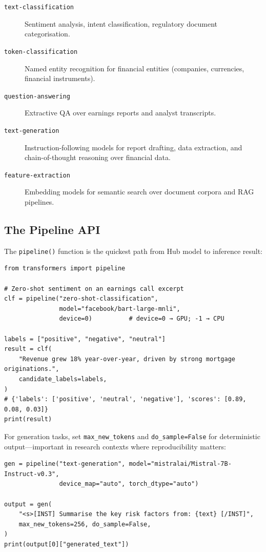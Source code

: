 \begin{description}
  \item[\texttt{text-classification}] Sentiment analysis, intent classification,
        regulatory document categorisation.
  \item[\texttt{token-classification}] Named entity recognition for financial
        entities (companies, currencies, financial instruments).
  \item[\texttt{question-answering}] Extractive QA over earnings reports and
        analyst transcripts.
  \item[\texttt{text-generation}] Instruction-following models for report
        drafting, data extraction, and chain-of-thought reasoning over
        financial data.
  \item[\texttt{feature-extraction}] Embedding models for semantic search over
        document corpora and RAG pipelines.
\end{description}

\subsection{The Pipeline API}
\label{app:hf:pipeline}

The \texttt{pipeline()} function is the quickest path from Hub model to
inference result:

\begin{verbatim}
from transformers import pipeline

# Zero-shot sentiment on an earnings call excerpt
clf = pipeline("zero-shot-classification",
               model="facebook/bart-large-mnli",
               device=0)          # device=0 → GPU; -1 → CPU

labels = ["positive", "negative", "neutral"]
result = clf(
    "Revenue grew 18% year-over-year, driven by strong mortgage originations.",
    candidate_labels=labels,
)
# {'labels': ['positive', 'neutral', 'negative'], 'scores': [0.89, 0.08, 0.03]}
print(result)
\end{verbatim}

For generation tasks, set \texttt{max\_new\_tokens} and
\texttt{do\_sample=False} for deterministic output---important in research
contexts where reproducibility matters:

\begin{verbatim}
gen = pipeline("text-generation", model="mistralai/Mistral-7B-Instruct-v0.3",
               device_map="auto", torch_dtype="auto")

output = gen(
    "<s>[INST] Summarise the key risk factors from: {text} [/INST]",
    max_new_tokens=256, do_sample=False,
)
print(output[0]["generated_text"])
\end{verbatim}

